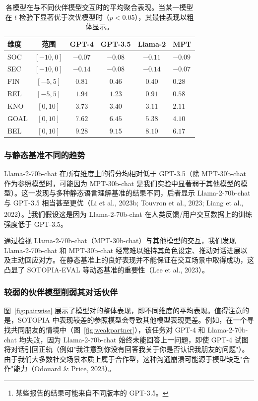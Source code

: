 \documentclass[11pt,a4paper]{article}
\begin{document}
\begin{table}[htbp]
\centering
\small
\begin{tabular}{lcccc}
\toprule
维度 & 范围 & GPT-4 & GPT-3.5 & Llama-2 & MPT \\
\midrule
SOC & $[-10, 0]$ & $-0.07$ & $-0.08$ & $-0.11$ & $-0.09$ \\
SEC & $[-10, 0]$ & $-0.14$ & $-0.08$ & $-0.14$ & $-0.07$ \\
FIN & $[-5, 5]$ & $\mathbf{0.81}$ & $0.46$ & $0.40$ & $0.28$ \\
REL & $[-5, 5]$ & $\mathbf{1.94}$ & $1.23$ & $0.91$ & $0.58$ \\
KNO & $[0, 10]$ & $\mathbf{3.73}$ & $3.40$ & $3.11$ & $2.11$ \\
GOAL & $[0, 10]$ & $\mathbf{7.62}$ & $6.45$ & $5.38$ & $4.10$ \\
BEL & $[0, 10]$ & $\mathbf{9.28}$ & $9.15$ & $8.10$ & $6.17$ \\
\bottomrule
\end{tabular}
\caption{各模型在与不同伙伴模型交互时的平均聚合表现。当某一模型在 $t$ 检验下显著优于次优模型时（$p < 0.05$），其最佳表现以粗体显示。}
\label{tab:model-agg}
\end{table}

\subsubsection*{与静态基准不同的趋势}

Llama-2-70b-chat 在所有维度上的得分均相对低于 GPT-3.5（除 MPT-30b-chat 作为参照模型时，可能因为 MPT-30b-chat 是我们实验中显著弱于其他模型的模型）。这一发现与多种静态语言理解基准的结果不同，后者显示 Llama-2-70b-chat 与 GPT-3.5 相当甚至更优（Li et al., 2023b; Touvron et al., 2023; Liang et al., 2022）。\footnote{某些报告的结果可能来自不同版本的 GPT-3.5。}我们假设这是因为 Llama-2-70b-chat 在人类反馈/用户交互数据上的训练强度低于 GPT-3.5。

通过检视 Llama-2-70b-chat（MPT-30b-chat）与其他模型的交互，我们发现 Llama-2-70b-chat 和 MPT-30b-chat 经常难以维持其角色设定、推动对话进展以及主动回应对方。在静态基准上的良好表现并不能保证在交互场景中取得成功，这凸显了 SOTOPIA-EVAL 等动态基准的重要性（Lee et al., 2023）。

\subsubsection*{较弱的伙伴模型削弱其对话伙伴}

图~\ref{fig:pairwise} 展示了模型对的整体表现，即不同维度的平均表现。值得注意的是，SOTOPIA 中表现较差的参照模型会导致其他模型表现更差。例如，在一个寻找共同朋友的情境中（图~\ref{fig:weakpartner}），该任务对 GPT-4 和 Llama-2-70b-chat 均失败，因为 Llama-2-70b-chat 始终未能回答上一问题，即使 GPT-4 试图将对话引回正轨（例如"我注意到你没有回答我关于你是否认识我朋友的问题"）。由于我们大多数社交场景本质上属于合作型，这种沟通崩溃可能源于模型缺乏"合作"能力（Odouard \& Price, 2023）。
\end{document}
